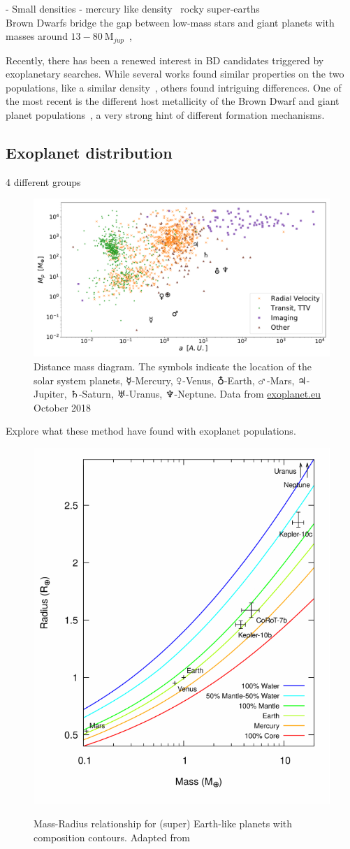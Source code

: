 - Small densities - mercury like  density~\citet{dittmann_temperate_2017, santerne_earthsized_2018, ment_second_2018} rocky super-earths\\



Brown Dwarfs bridge the gap between low-mass stars and giant planets with masses around \(13-80~\textrm{M}_{jup} \)~\citep{chabrier_theory_2000}, 




Recently, there has been a renewed interest in BD candidates triggered by exoplanetary searches.
While several works found similar properties on the two populations, like a similar density~\citep{hatzes_definition_2015}, others found intriguing differences.
One of the most recent is the different host metallicity of the Brown Dwarf and giant planet populations~\citep{santos_observational_2017, schlaufman_evidence_2018}, a very strong hint of different formation mechanisms.



\subsection{Exoplanet distribution} 4 different groups


\begin{figure}
    \centering
    \includegraphics[width=0.\linewidth]{./figures/introduction/exoplanetEU_a_mass.pdf}
    \caption{Distance mass diagram.
        The symbols indicate the location of the solar system planets, $\mercury$-Mercury, $\venus$-Venus, $\earth$-Earth, $\mars$-Mars, $\jupiter$-Jupiter, $\saturn$-Saturn, $\uranus$-Uranus, $\neptune$-Neptune.
        Data from \href{http://ww.exoplanet.eu}{exoplanet.eu} October 2018}
    \label{fig:pltoverlayadd}
\end{figure}


Explore what these method have found with exoplanet populations.


\begin{figure}[t]
    \centering
    \includegraphics[width=0.4\linewidth]{./figures/introduction/Mass_radius_relation-compostion_Brugger_2017.pdf}\\
    \caption{Mass-Radius relationship for (super) Earth-like planets with composition contours.
        Adapted from~\citet{brugger_constraints_2017}}
    \label{fig:mass_radius_relation_composition}
\end{figure}


